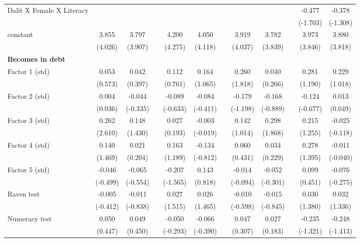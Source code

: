 {\begin{longtable}{@{\extracolsep{\fill}}lccccccccccc}
    Dalit X Female X Literacy &   &   &   &   &   &   &   &   &   & -0.477 & -0.378 \\
      &   &   &   &   &   &   &   &   &   & (-1.703) & (-1.308) \\
    constant & 3.855 & 3.797 &   & 4.200 & 4.050 &   & 3.919 & 3.782 &   & 3.973 & 3.880 \\
      & (4.026) & (3.907) &   & (4.275) & (4.118) &   & (4.037) & (3.839) &   & (3.846) & (3.818) \\
    \midrule
    \textbf{Becomes in debt} &   &   &   &   &   &   &   &   &   &   &  \\
    Factor 1 (std) & 0.053 & 0.042 &   & 0.112 & 0.164 &   & 0.260 & 0.040 &   & 0.281 & 0.229 \\
      & (0.573) & (0.397) &   & (0.761) & (1.065) &   & (1.818) & (0.266) &   & (1.190) & (1.018) \\
    Factor 2 (std) & 0.004 & -0.044 &   & -0.089 & -0.084 &   & -0.179 & -0.168 &   & -0.124 & 0.013 \\
      & (0.036) & (-0.335) &   & (-0.633) & (-0.411) &   & (-1.198) & (-0.889) &   & (-0.677) & (0.049) \\
    Factor 3 (std) & 0.262 & 0.148 &   & 0.027 & -0.003 &   & 0.142 & 0.298 &   & 0.215 & -0.025 \\
      & (2.610) & (1.430) &   & (0.193) & (-0.019) &   & (1.014) & (1.868) &   & (1.255) & (-0.118) \\
    Factor 4 (std) & 0.140 & 0.021 &   & 0.163 & -0.134 &   & 0.060 & 0.034 &   & 0.278 & -0.011 \\
      & (1.469) & (0.204) &   & (1.189) & (-0.812) &   & (0.431) & (0.229) &   & (1.395) & (-0.040) \\
    Factor 5 (std) & -0.046 & -0.065 &   & -0.207 & 0.143 &   & -0.014 & -0.052 &   & 0.099 & -0.076 \\
      & (-0.499) & (-0.554) &   & (-1.565) & (0.818) &   & (-0.094) & (-0.301) &   & (0.451) & (-0.275) \\
    Raven test & -0.005 & -0.011 &   & 0.027 & 0.026 &   & -0.010 & -0.015 &   & 0.030 & 0.032 \\
      & (-0.412) & (-0.838) &   & (1.515) & (1.465) &   & (-0.598) & (-0.845) &   & (1.380) & (1.336) \\
    Numeracy test & 0.050 & 0.049 &   & -0.050 & -0.066 &   & 0.047 & 0.027 &   & -0.235 & -0.248 \\
      & (0.447) & (0.450) &   & (-0.293) & (-0.390) &   & (0.307) & (0.183) &   & (-1.321) & (-1.413) \\

\end{longtable}}
